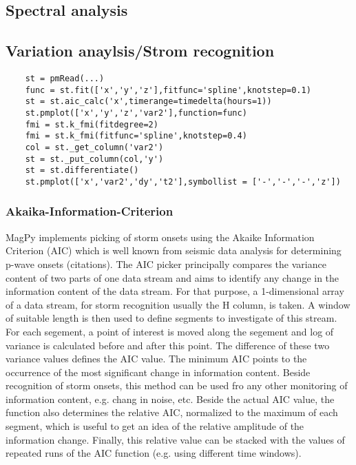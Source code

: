 \subsection{Spectral analysis}

\subsection{Variation anaylsis/Strom recognition}

\begin{verbatim}
    st = pmRead(...)
    func = st.fit(['x','y','z'],fitfunc='spline',knotstep=0.1)
    st = st.aic_calc('x',timerange=timedelta(hours=1))
    st.pmplot(['x','y','z','var2'],function=func)
    fmi = st.k_fmi(fitdegree=2)
    fmi = st.k_fmi(fitfunc='spline',knotstep=0.4)
    col = st._get_column('var2')
    st = st._put_column(col,'y')
    st = st.differentiate()
    st.pmplot(['x','var2','dy','t2'],symbollist = ['-','-','-','z'])
\end{verbatim}


\subsubsection{Akaika-Information-Criterion}\label{AIC}

MagPy implements picking of storm onsets using the Akaike Information Criterion (AIC) which is well known from seismic data analysis for determining p-wave onsets (citations).
The AIC picker principally compares the variance content of two parts of one data stream and aims to identify any change in the information content of the data stream. For that purpose, a 1-dimensional array of a data stream, for storm recognition usually the H column, is taken. A window of suitable length is then used to define segments to investigate of this stream. For each segement, a point of interest is moved along the segement and log of variance is calculated before and after this point. The difference of these two variance values defines the AIC value. The minimum AIC points to the occurrence of the most significant change in information content. Beside recognition of storm onsets, this method can be used fro any other monitoring of information content, e.g. chang in noise, etc. Beside the actual AIC value, the function also determines the relative AIC, normalized to the maximum of each segment, which is useful to get an idea of the relative amplitude of the information change. Finally, this relative value can be stacked with the values of repeated runs of the AIC function (e.g. using different time windows).

